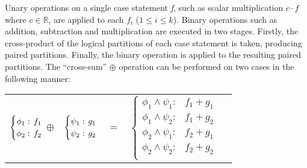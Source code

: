 Unary operations on a single case statement \emph{f}, such as scalar multiplication $c \cdot f$ where $ c \in \mathbb{R} $, are applied to  each $f_i$ ($1 \leq i \leq k$). Binary operations such as addition, subtraction and multiplication are executed in two stages. Firstly, the cross-product of the logical partitions of each case statement is taken, producing paired partitions. Finally, the binary operation is applied to the resulting paired partitions. The ``cross-sum'' $\oplus$ operation can be performed on two cases in the following manner:
{\footnotesize 
    \abovedisplayskip=5pt
    \belowdisplayskip=0pt
    \begin{center}
        \begin{tabular}{r c c c l}
            $\begin{cases}
            \phi_1: \hspace{-1mm} & \hspace{-1mm} f_1  \\ 
            \phi_2: \hspace{-1mm} & \hspace{-1mm} f_2  \\ 
            \end{cases}$
            $\oplus$
            &
            \hspace{-4mm}
            $\begin{cases}
            \psi_1: \hspace{-1mm} & \hspace{-1mm} g_1  \\ 
            \psi_2: \hspace{-1mm} & \hspace{-1mm} g_2  \\ 
            \end{cases}$
            &
            \hspace{-4mm} 
            $ = $
            &
            \hspace{-4mm}
            $\begin{cases}
            \phi_1 \wedge \psi_1: & f_1 + g_1 \\
            \phi_1 \wedge \psi_2: & f_1 + g_2 \\
            \phi_2 \wedge \psi_1: & f_2 + g_1 \\
            \phi_2 \wedge \psi_2: & f_2 + g_2  \\
            \end{cases}$
        \end{tabular}
    \end{center}
}%

